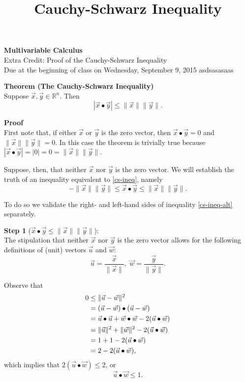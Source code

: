 \documentclass[11pt]{article}
\begin{document}
\title{Cauchy-Schwarz Inequality}

\thispagestyle{empty}

\begin{center}
{\LARGE \bf Multivariable Calculus}\\
{\large Extra Credit: Proof of the Cauchy-Schwarz Inequality}\\
Due at the beginning of class on Wednesday, September 9, 2015
asdsasasaas
\end{center}

\textbf{Theorem (The Cauchy-Schwarz Inequality)}\\
Suppose $\vec{x},\vec{y} \in \mathbb{R}^n$. Then 
\begin{equation}
|\vec{x} \bullet \vec{y}| \le \|\vec{x}\| \|\vec{y}\| \label{cs-ineq}.
\end{equation}

\textbf{Proof}\\
First note that, if either $\vec{x}$ or $\vec{y}$ is the zero vector, 
then $\vec{x} \bullet \vec{y} = 0$ and $\|\vec{x}\| \|\vec{y}\| = 0$. 
In this case the theorem is trivially true because 
$|\vec{x} \bullet \vec{y}| = |0| = 0 = \|\vec{x}\| \|\vec{y}\|$.

Suppose, then, that neither $\vec{x}$ nor $\vec{y}$ is the zero vector. 
We will establish the truth of an inequality equivalent to \eqref{cs-ineq}, 
namely
\begin{equation}
-\|\vec{x}\| \|\vec{y}\| \le \vec{x} \bullet \vec{y} \le 
\|\vec{x}\| \|\vec{y}\|. \label{cs-ineq-alt}
\end{equation}
  
To do so we validate the right- and left-hand sides of inequality 
\eqref{cs-ineq-alt} separately.

\textbf{Step 1} ($\vec{x} \bullet \vec{y} \le \|\vec{x}\| \|\vec{y}\|$):\\
The stipulation that neither $\vec{x}$ nor $\vec{y}$ is the zero vector 
allows for the following definitions of (unit) vectors $\vec{u}$ and $\vec{w}$:
\begin{equation}
\vec{u} = \frac{\vec{x}}{\|\vec{x}\|}, \; \vec{w} = 
\frac{\vec{y}}{\|\vec{y}\|}. \label{def1}
\end{equation}

Observe that
\begin{align}
0 & \le \|\vec{u}-\vec{w}\|^2 \notag\\
  & =(\vec{u}-\vec{w}) \bullet (\vec{u}-\vec{w}) \notag\\
  & = \vec{u} \bullet \vec{u} + \vec{w} \bullet \vec{w} - 2(\vec{u}\bullet\vec{w}) \notag\\
  & = \|\vec{u}\|^2 + \|\vec{w}\|^2 - 2(\vec{u} \bullet \vec{w}) \notag\\
  & = 1 + 1 - 2(\vec{u} \bullet \vec{w}) \notag\\
  & = 2 - 2(\vec{u} \bullet \vec{w}) \label{eq1},
\end{align}
which implies that $2(\vec{u} \bullet \vec{w}) \le 2$, or
\begin{equation}
  \vec{u} \bullet \vec{w} \le 1. \label{final}
\end{equation}
\end{document}

